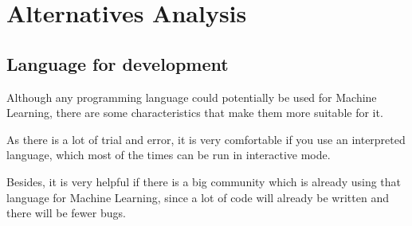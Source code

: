 \documentclass{article}
\begin{document}
%
\section{Alternatives Analysis}
    \subsection{Language for development}
    Although any programming language could potentially be used for Machine
    Learning, there are some characteristics that make them more suitable for
    it.

    As there is a lot of trial and error, it is very comfortable if you use an
    interpreted language, which most of the times can be run in interactive
    mode.

    Besides, it is very helpful if there is a big community which is already
    using that language for Machine Learning, since a lot of code will already
    be written and there will be fewer bugs.
\end{document}
